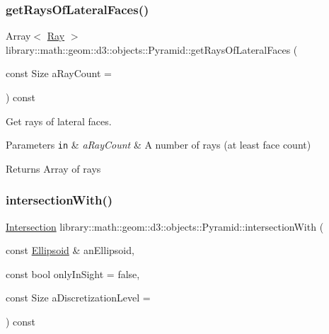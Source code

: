 \subsubsection{\texorpdfstring{get\+Rays\+Of\+Lateral\+Faces()}{getRaysOfLateralFaces()}}
{\footnotesize\ttfamily Array$<$ \hyperlink{classlibrary_1_1math_1_1geom_1_1d3_1_1objects_1_1_ray}{Ray} $>$ library\+::math\+::geom\+::d3\+::objects\+::\+Pyramid\+::get\+Rays\+Of\+Lateral\+Faces (\begin{DoxyParamCaption}\item[{const Size}]{a\+Ray\+Count = {} }\end{DoxyParamCaption}) const}



Get rays of lateral faces. 


\begin{DoxyParams}[1]{Parameters}
\mbox{\tt in}  & {\em a\+Ray\+Count} & A number of rays (at least face count) \\
\hline
\end{DoxyParams}
\begin{DoxyReturn}{Returns}
Array of rays 
\end{DoxyReturn}
\mbox{\label{classlibrary_1_1math_1_1geom_1_1d3_1_1objects_1_1_pyramid_a299c41f4cbd61ec24799815dfd7c386d}} 
\subsubsection{\texorpdfstring{intersection\+With()}{intersectionWith()}}
{\footnotesize\ttfamily \hyperlink{classlibrary_1_1math_1_1geom_1_1d3_1_1_intersection}{Intersection} library\+::math\+::geom\+::d3\+::objects\+::\+Pyramid\+::intersection\+With (\begin{DoxyParamCaption}\item[{const \hyperlink{classlibrary_1_1math_1_1geom_1_1d3_1_1objects_1_1_ellipsoid}{Ellipsoid} \&}]{an\+Ellipsoid,  }\item[{const bool}]{only\+In\+Sight = {\ttfamily false},  }\item[{const Size}]{a\+Discretization\+Level = {} }\end{DoxyParamCaption}) const}



